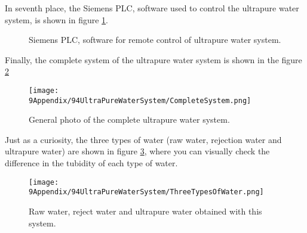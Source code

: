 In seventh place, the Siemens PLC, software used to control the ultrapure water system, is shown in figure \ref{fig:Siemens}.

\begin{figure}[htbp]
 \centering
 \caption{Siemens PLC, software for remote control of ultrapure water system.}
 \label{fig:Siemens}
\end{figure}

Finally, the complete system of the ultrapure water system is shown in the figure \ref{fig:CompleteSystem}

\begin{figure}[htbp]
\centering
\texttt{[image: 9Appendix/94UltraPureWaterSystem/CompleteSystem.png]}
\caption{General photo of the complete ultrapure water system.\label{fig:CompleteSystem}}
\end{figure}

Just as a curiosity, the three types of water (raw water, rejection water and ultrapure water) are shown in figure \ref{fig:ThreeTypesOfWater}, where you can visually check the difference in the tubidity of each type of water.

\begin{figure}[htbp]
\centering
\texttt{[image: 9Appendix/94UltraPureWaterSystem/ThreeTypesOfWater.png]}
\caption{Raw water, reject water and ultrapure water obtained with this system.\label{fig:ThreeTypesOfWater}}
\end{figure}
